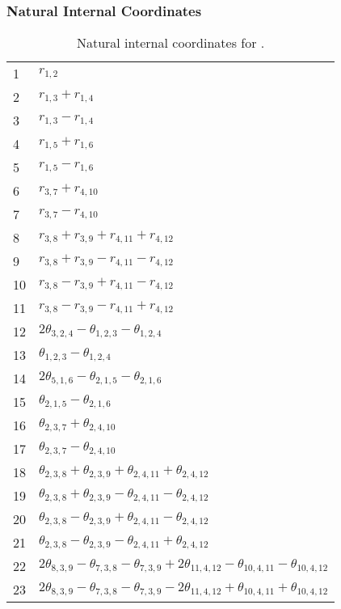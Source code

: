 \documentclass[10pt,oneside]{article}
\begin{document}
\begin{table}[h!]
\subsubsection*{Natural Internal Coordinates}
\centering
\caption{Natural internal coordinates for .}
\small
\begin{tabular}{ll}
\toprule
  1   & $r_{1,2}$ \\
  2   & $r_{1,3} + r_{1,4}$ \\
  3   & $r_{1,3} - r_{1,4}$ \\
  4   & $r_{1,5} + r_{1,6}$ \\
  5   & $r_{1,5} - r_{1,6}$ \\
  6   & $r_{3,7} + r_{4,10}$ \\
  7   & $r_{3,7} - r_{4,10}$ \\
  8   & $r_{3,8} + r_{3,9} + r_{4,11} + r_{4,12}$ \\
  9   & $r_{3,8} + r_{3,9} - r_{4,11} - r_{4,12}$ \\
  10  & $r_{3,8} - r_{3,9} + r_{4,11} - r_{4,12}$ \\
  11  & $r_{3,8} - r_{3,9} - r_{4,11} + r_{4,12}$ \\
  12  & $2\theta_{3,2,4} - \theta_{1,2,3} - \theta_{1,2,4}$ \\
  13  & $\theta_{1,2,3} - \theta_{1,2,4}$ \\
  14  & $2\theta_{5,1,6} - \theta_{2,1,5} - \theta_{2,1,6}$ \\
  15  & $\theta_{2,1,5} - \theta_{2,1,6}$ \\
  16  & $\theta_{2,3,7} + \theta_{2,4,10}$ \\
  17  & $\theta_{2,3,7} - \theta_{2,4,10}$ \\
  18  & $\theta_{2,3,8} + \theta_{2,3,9} + \theta_{2,4,11} + \theta_{2,4,12}$ \\
  19  & $\theta_{2,3,8} + \theta_{2,3,9} - \theta_{2,4,11} - \theta_{2,4,12}$ \\
  20  & $\theta_{2,3,8} - \theta_{2,3,9} + \theta_{2,4,11} - \theta_{2,4,12}$ \\
  21  & $\theta_{2,3,8} - \theta_{2,3,9} - \theta_{2,4,11} + \theta_{2,4,12}$ \\
  22  & $2\theta_{8,3,9} - \theta_{7,3,8} - \theta_{7,3,9} + 2\theta_{11,4,12} - \theta_{10,4,11} - \theta_{10,4,12}$ \\
  23  & $2\theta_{8,3,9} - \theta_{7,3,8} - \theta_{7,3,9} - 2\theta_{11,4,12} + \theta_{10,4,11} + \theta_{10,4,12}$ \\

\end{tabular}
\end{table}
\end{document}
